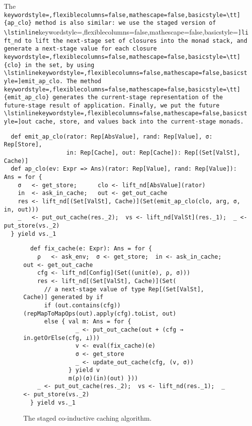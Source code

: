 The \lstinline[keywordstyle=,flexiblecolumns=false,mathescape=false,basicstyle=\tt]{ap_clo} method is also similar: we use the staged version of \lstinline[keywordstyle=,flexiblecolumns=false,mathescape=false,basicstyle=\tt]{lift_nd} to
lift the next-stage set of closures into the monad stack, and generate a
next-stage value for each closure \lstinline[keywordstyle=,flexiblecolumns=false,mathescape=false,basicstyle=\tt]{clo} in the set, by using \lstinline[keywordstyle=,flexiblecolumns=false,mathescape=false,basicstyle=\tt]{emit_ap_clo}. The
method \lstinline[keywordstyle=,flexiblecolumns=false,mathescape=false,basicstyle=\tt]{emit_ap_clo} generates the current-stage representation of the
future-stage result of application.
Finally, we put the future \lstinline[keywordstyle=,flexiblecolumns=false,mathescape=false,basicstyle=\tt]{out} cache, store, and values back into
the current-stage monads.
\begin{lstlisting}
  def emit_ap_clo(rator: Rep[AbsValue], rand: Rep[Value], σ: Rep[Store],
                  in: Rep[Cache], out: Rep[Cache]): Rep[(Set[ValSt], Cache)]
  def ap_clo(ev: Expr => Ans)(rator: Rep[Value], rand: Rep[Value]): Ans = for {
    σ   <- get_store;      clo <- lift_nd[AbsValue](rator)
    in  <- ask_in_cache;   out <- get_out_cache
    res <- lift_nd[(Set[ValSt], Cache)](Set(emit_ap_clo(clo, arg, σ, in, out)))
    _   <- put_out_cache(res._2);  vs <- lift_nd[ValSt](res._1);  _ <- put_store(vs._2)
  } yield vs._1
\end{lstlisting}

\begin{figure}[h!]
  \centering
\begin{lstlisting}
  def fix_cache(e: Expr): Ans = for {
    ρ   <- ask_env;  σ <- get_store;  in <- ask_in_cache;  out <- get_out_cache
    cfg <- lift_nd[Config](Set((unit(e), ρ, σ)))
    res <- lift_nd[(Set[ValSt], Cache)](Set(
      // a next-stage value of type Rep[(Set[ValSt], Cache)] generated by if
      if (out.contains(cfg)) (repMapToMapOps(out).apply(cfg).toList, out)
      else { val m: Ans = for {
               _ <- put_out_cache(out + (cfg → in.getOrElse(cfg, ⊥)))
               v <- eval(fix_cache)(e)
               σ <- get_store
               _ <- update_out_cache(cfg, (v, σ))
             } yield v
             m(ρ)(σ)(in)(out) }))
    _ <- put_out_cache(res._2);  vs <- lift_nd(res._1);  _ <- put_store(vs._2)
  } yield vs._1
\end{lstlisting}
\caption{The staged co-inductive caching algorithm.}
\label{fig:staged_coind_cache}
\end{figure}

